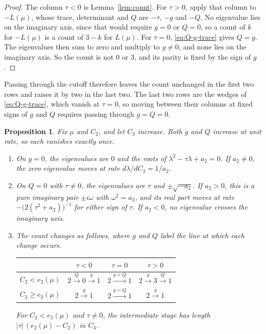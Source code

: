 \documentclass[11pt]{article}
\newtheorem{proposition}{Proposition}
\theoremstyle{definition}
\theoremstyle{remark}
\begin{document}
\begin{proof}
The column $\tau<0$ is Lemma~\ref{lem:count}. For $\tau>0$, apply that column to $-L(\mu)$, whose trace, determinant and $Q$ are $-\tau$, $-g$ and $-Q$. No eigenvalue lies on the imaginary axis, since that would require $g=0$ or $Q=0$, so a count of $k$ for $-L(\mu)$ is a count of $3-k$ for $L(\mu)$. For $\tau=0$, \eqref{eq:Q-g-trace} gives $Q=g$. The eigenvalues then sum to zero and multiply to $g\neq0$, and none lies on the imaginary axis. So the count is not $0$ or $3$, and its parity is fixed by the sign of $g$.
\end{proof}

Passing through the cutoff therefore leaves the count unchanged in the first two rows and raises it by two in the last two. The last two rows are the wedges of \eqref{eq:Q-g-trace}, which vanish at $\tau=0$, so moving between their columns at fixed signs of $g$ and $Q$ requires passing through $g=Q=0$.

\begin{proposition}\label{prop:trace-crossing}
Fix $\mu$ and $C_2$, and let $C_3$ increase. Both $g$ and $Q$ increase at unit rate, so each vanishes exactly once.
\begin{enumerate}
\item On $g=0$, the eigenvalues are $0$ and the roots of $\lambda^2-\tau\lambda+a_2=0$. If $a_2\neq0$, the zero eigenvalue moves at rate $d\lambda/dC_3=1/a_2$.
\item On $Q=0$ with $\tau\neq0$, the eigenvalues are $\tau$ and $\pm\sqrt{-a_2}$. If $a_2>0$, this is a pure imaginary pair $\pm i\omega$ with $\omega^2=a_2$, and its real part moves at rate $-\bigl(2(\tau^2+a_2)\bigr)^{-1}$ for either sign of $\tau$. If $a_2<0$, no eigenvalue crosses the imaginary axis.
\item The count changes as follows, where $g$ and $Q$ label the line at which each change occurs.
\begin{center}
\renewcommand{\arraystretch}{1.25}
\begin{tabular}{|c|c|c|c|}
\hline
 & $\tau<0$ & $\tau=0$ & $\tau>0$ \\
\hline
$C_2<e_2(\mu)$ & $2\xrightarrow{Q}0\xrightarrow{g}1$ & $2\xrightarrow{g=Q}1$ & $2\xrightarrow{g}3\xrightarrow{Q}1$ \\
\hline
$C_2\ge e_2(\mu)$ & $2\xrightarrow{g}1$ & $2\xrightarrow{g=Q}1$ & $2\xrightarrow{g}1$ \\
\hline
\end{tabular}
\end{center}
For $C_2<e_2(\mu)$ and $\tau\neq0$, the intermediate stage has length $|\tau|\,(e_2(\mu)-C_2)$ in $C_3$.
\end{enumerate}
\end{proposition}
\end{document}
